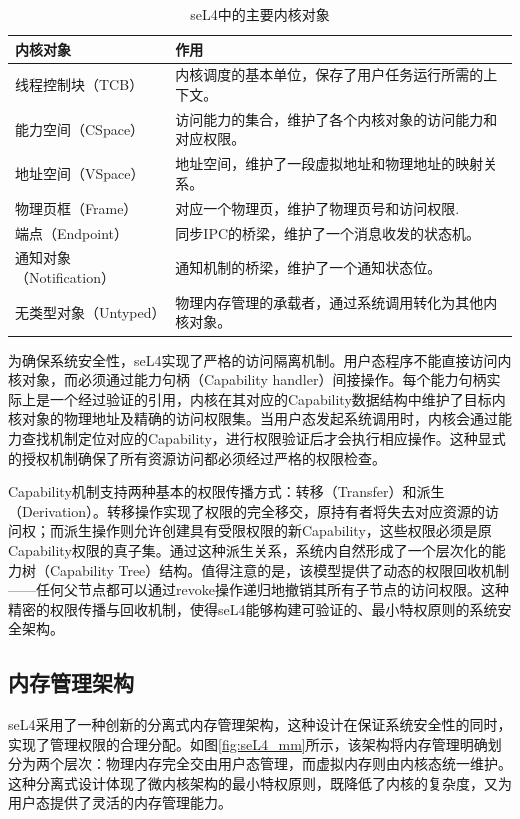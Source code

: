 \begin{table}[htbp]
  \centering
  \caption{seL4中的主要内核对象} 
  \begin{tabular*}{1.0\textwidth}{@{\extracolsep{\fill}}ll}
  \toprule
    内核对象			&作用	 \\
  \midrule
    线程控制块（TCB）			&内核调度的基本单位，保存了用户任务运行所需的上下文。 \\
    能力空间（CSpace）			&访问能力的集合，维护了各个内核对象的访问能力和对应权限。	 \\
    地址空间（VSpace） &地址空间，维护了一段虚拟地址和物理地址的映射关系。	 \\
    物理页框（Frame）  &对应一个物理页，维护了物理页号和访问权限.\\
    端点（Endpoint）	&同步IPC的桥梁，维护了一个消息收发的状态机。 \\
    通知对象（Notification） &通知机制的桥梁，维护了一个通知状态位。\\
    无类型对象（Untyped）&物理内存管理的承载者，通过系统调用转化为其他内核对象。 \\
  \bottomrule
  \end{tabular*}
  \label{tab:kernel_object}
\end{table}

为确保系统安全性，seL4实现了严格的访问隔离机制。用户态程序不能直接访问内核对象，而必须通过能力句柄（Capability handler）间接操作。每个能力句柄实际上是一个经过验证的引用，内核在其对应的Capability数据结构中维护了目标内核对象的物理地址及精确的访问权限集。当用户态发起系统调用时，内核会通过能力查找机制定位对应的Capability，进行权限验证后才会执行相应操作。这种显式的授权机制确保了所有资源访问都必须经过严格的权限检查。

Capability机制支持两种基本的权限传播方式：转移（Transfer）和派生（Derivation）。转移操作实现了权限的完全移交，原持有者将失去对应资源的访问权；而派生操作则允许创建具有受限权限的新Capability，这些权限必须是原Capability权限的真子集。通过这种派生关系，系统内自然形成了一个层次化的能力树（Capability Tree）结构。值得注意的是，该模型提供了动态的权限回收机制——任何父节点都可以通过revoke操作递归地撤销其所有子节点的访问权限。这种精密的权限传播与回收机制，使得seL4能够构建可验证的、最小特权原则的系统安全架构。

\subsection{内存管理架构}

seL4采用了一种创新的分离式内存管理架构，这种设计在保证系统安全性的同时，实现了管理权限的合理分配。如图\ref{fig:seL4_mm}所示，该架构将内存管理明确划分为两个层次：物理内存完全交由用户态管理，而虚拟内存则由内核态统一维护。这种分离式设计体现了微内核架构的最小特权原则，既降低了内核的复杂度，又为用户态提供了灵活的内存管理能力。

